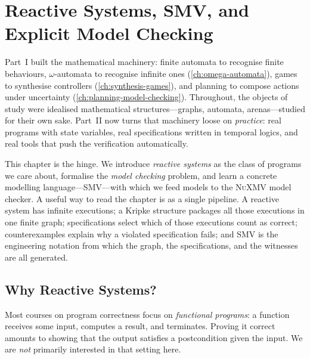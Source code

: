 
\chapter{Reactive Systems, SMV, and Explicit Model Checking}
\label{ch:reactive-smv}


Part~I built the mathematical machinery: finite automata to recognise
finite behaviours, $\omega$-automata to recognise infinite ones
(\cref{ch:omega-automata}), games to synthesise controllers
(\cref{ch:synthesis-games}), and planning to compose actions under
uncertainty (\cref{ch:planning-model-checking}).  Throughout, the objects
of study were idealised mathematical structures---graphs, automata,
arenas---studied for their own sake.  Part~II now turns that machinery
loose on \emph{practice}: real programs with state variables, real
specifications written in temporal logics, and real tools that push the
verification automatically.

This chapter is the hinge.  We introduce \emph{reactive systems} as the
class of programs we care about, formalise the \emph{model checking}
problem, and learn a concrete modelling language---SMV---with which we
feed models to the \textsc{NuXMV} model checker.  A useful way to read
the chapter is as a single pipeline.  A reactive system has infinite
executions; a Kripke structure packages all those executions in one
finite graph; specifications select which of those executions count as
correct; counterexamples explain why a violated specification fails;
and SMV is the engineering notation from which the graph, the
specifications, and the witnesses are all generated.

\section{Why Reactive Systems?}
\label{sec:reactive-why}

Most courses on program correctness focus on \emph{functional programs}: a
function receives some input, computes a result, and terminates.  Proving
it correct amounts to showing that the output satisfies a postcondition given
the input.  We are \emph{not} primarily interested in that setting here.

